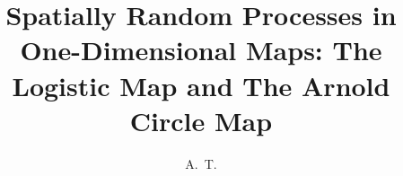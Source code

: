 \documentclass[defaultstyle,11pt]{thesis}
\title{Spatially Random Processes in One-Dimensional Maps: The
  Logistic Map and The Arnold Circle Map}
\author{A.~T.}{Le}
\begin{document}





\nocite{*}		%

\appendix


\end{document}
